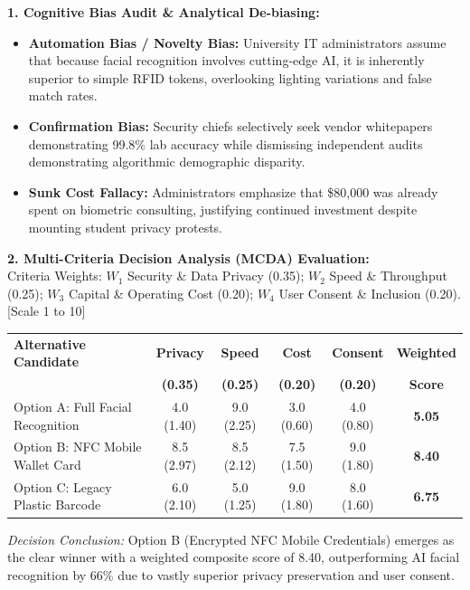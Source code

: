 \begin{solbox}
\textbf{1. Cognitive Bias Audit \& Analytical De-biasing:}\\
\begin{itemize}
    \item \textbf{Automation Bias / Novelty Bias:} University IT administrators assume that because facial recognition involves cutting-edge AI, it is inherently superior to simple RFID tokens, overlooking lighting variations and false match rates.
    \item \textbf{Confirmation Bias:} Security chiefs selectively seek vendor whitepapers demonstrating 99.8\% lab accuracy while dismissing independent audits demonstrating algorithmic demographic disparity.
    \item \textbf{Sunk Cost Fallacy:} Administrators emphasize that \$80,000 was already spent on biometric consulting, justifying continued investment despite mounting student privacy protests.
\end{itemize}

\textbf{2. Multi-Criteria Decision Analysis (MCDA) Evaluation:}\\
Criteria Weights: $W_1$ Security \& Data Privacy (0.35); $W_2$ Speed \& Throughput (0.25); $W_3$ Capital \& Operating Cost (0.20); $W_4$ User Consent \& Inclusion (0.20). [Scale 1 to 10]

{\small
\begin{tabularx}{\linewidth}{|X|c|c|c|c|c|} \hline
\textbf{Alternative Candidate} & \textbf{Privacy} & \textbf{Speed} & \textbf{Cost} & \textbf{Consent} & \textbf{Weighted} \\
 & \textbf{(0.35)} & \textbf{(0.25)} & \textbf{(0.20)} & \textbf{(0.20)} & \textbf{Score} \\ \hline
Option A: Full Facial Recognition & 4.0 (1.40) & 9.0 (2.25) & 3.0 (0.60) & 4.0 (0.80) & \textbf{5.05} \\ \hline
Option B: NFC Mobile Wallet Card & 8.5 (2.97) & 8.5 (2.12) & 7.5 (1.50) & 9.0 (1.80) & \textbf{8.40} \\ \hline
Option C: Legacy Plastic Barcode & 6.0 (2.10) & 5.0 (1.25) & 9.0 (1.80) & 8.0 (1.60) & \textbf{6.75} \\ \hline
\end{tabularx}\par}

\textit{Decision Conclusion:} Option B (Encrypted NFC Mobile Credentials) emerges as the clear winner with a weighted composite score of 8.40, outperforming AI facial recognition by 66\% due to vastly superior privacy preservation and user consent.


\end{solbox}
